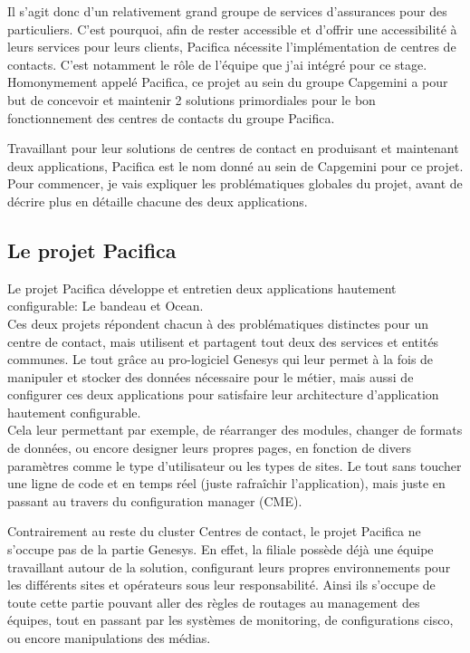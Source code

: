 \documentclass{rapport}
\begin{document}
Il s'agit donc d'un relativement grand groupe de services d'assurances pour des particuliers. C'est pourquoi, afin de rester accessible et d'offrir une accessibilité à leurs services pour leurs clients, Pacifica nécessite l'implémentation de centres de contacts. C'est notamment le rôle de l'équipe que j'ai intégré pour ce stage. Homonymement appelé Pacifica, ce projet au sein du groupe Capgemini a pour but de concevoir et maintenir 2 solutions primordiales pour le bon fonctionnement des centres de contacts du groupe Pacifica.

Travaillant pour leur solutions de centres de contact en produisant et maintenant deux applications, Pacifica est le nom donné au sein de Capgemini pour ce projet.\\

Pour commencer, je vais expliquer les problématiques globales du projet, avant de décrire plus en détaille chacune des deux applications.


\subsection{Le projet Pacifica}

Le projet Pacifica développe et entretien deux applications hautement configurable: Le bandeau et Ocean.\\
Ces deux projets répondent chacun à des problématiques distinctes pour un centre de contact, mais utilisent et partagent tout deux des services et entités communes. Le tout grâce au pro-logiciel Genesys qui leur permet à la fois de manipuler et stocker des données nécessaire pour le métier, mais aussi de configurer ces deux applications pour satisfaire leur architecture d'application hautement configurable.\\
Cela leur permettant par exemple, de réarranger des modules, changer de formats de données, ou encore designer leurs propres pages, en fonction de divers paramètres comme le type d'utilisateur ou les types de sites. Le tout sans toucher une ligne de code et en temps réel (juste rafraîchir l'application), mais juste en passant au travers du configuration manager (CME).

Contrairement au reste du cluster Centres de contact, le projet Pacifica ne s'occupe pas de la partie Genesys. En effet, la filiale possède déjà une équipe travaillant autour de la solution, configurant leurs propres environnements pour les différents sites et opérateurs sous leur responsabilité. Ainsi ils s'occupe de toute cette partie pouvant aller des règles de routages au management des équipes, tout en passant par les systèmes de monitoring, de configurations cisco, ou encore manipulations des médias.\\
\end{document}
